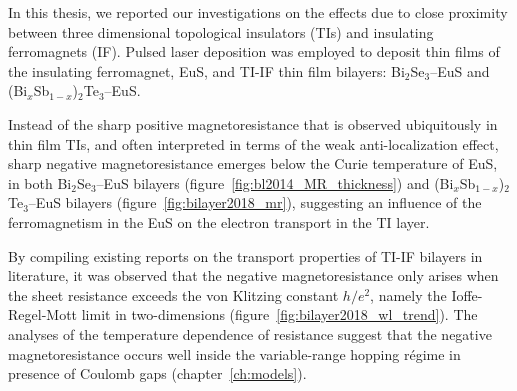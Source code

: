In this thesis, we reported our investigations on the effects due to close proximity between three dimensional topological insulators (TIs) and insulating ferromagnets (IF). Pulsed laser deposition was employed to deposit thin films of the insulating ferromagnet, EuS, and TI-IF thin film bilayers: Bi$_2$Se$_3$--EuS and (Bi$_x$Sb$_{1-x}$)$_2$Te$_3$--EuS.

Instead of the sharp positive magnetoresistance that is observed ubiquitously in thin film TIs, and often interpreted in terms of the weak anti-localization effect, sharp negative magnetoresistance emerges below the Curie temperature of EuS, in both Bi$_2$Se$_3$--EuS bilayers (figure~\ref{fig:bl2014_MR_thickness}) and (Bi$_x$Sb$_{1-x}$)$_2$Te$_3$--EuS bilayers (figure~\ref{fig:bilayer2018_mr}), suggesting an influence of the ferromagnetism in the EuS on the electron transport in the TI layer.

By compiling existing reports on the transport properties of TI-IF bilayers in literature, it was observed that the negative magnetoresistance only arises when the sheet resistance exceeds the von Klitzing constant $h / e^2$, namely the Ioffe-Regel-Mott limit in two-dimensions (figure~\ref{fig:bilayer2018_wl_trend}). The analyses of the temperature dependence of resistance suggest that the negative magnetoresistance occurs well inside the variable-range hopping r\'egime in presence of Coulomb gaps (chapter~\ref{ch:models}).